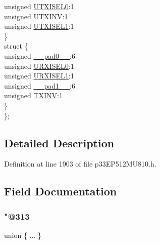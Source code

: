 \begin{DoxyCompactItemize}
\begin{tabbing}
\>\>unsigned \hyperlink{structtag_u3_s_t_a_b_i_t_s_aaff1f97a591df18ff20cf189a2944089}{UTXISEL0}:1\\
\>\>unsigned \hyperlink{structtag_u3_s_t_a_b_i_t_s_a08dde9c5ebe6558bfae4ea659190ddb6}{UTXINV}:1\\
\>\>unsigned \hyperlink{structtag_u3_s_t_a_b_i_t_s_af7ce0d24148cffc8fc3d8abccf37ea9f}{UTXISEL1}:1\\
\>\} \\
\>struct \{\\
\>\>unsigned \hyperlink{structtag_u3_s_t_a_b_i_t_s_adf71f3d8410c1f1dbbc96680a92c49af}{\_\_pad0\_\_}:6\\
\>\>unsigned \hyperlink{structtag_u3_s_t_a_b_i_t_s_af79a21216ad16ee2c61e03f238f42e6a}{URXISEL0}:1\\
\>\>unsigned \hyperlink{structtag_u3_s_t_a_b_i_t_s_a18f8693c16d1aaec33bf9058dc1ea2d2}{URXISEL1}:1\\
\>\>unsigned \hyperlink{structtag_u3_s_t_a_b_i_t_s_acaf2d0924a107ec6e8d2e31febaf66f9}{\_\_pad1\_\_}:6\\
\>\>unsigned \hyperlink{structtag_u3_s_t_a_b_i_t_s_a2baa3dcc3e10cb6a9f3fce197d05376b}{TXINV}:1\\
\>\} \\
\}; \\

\end{tabbing}\end{DoxyCompactItemize}


\subsection{Detailed Description}


Definition at line 1903 of file p33\+E\+P512\+M\+U810.\+h.



\subsection{Field Documentation}
\mbox{\label{structtag_u3_s_t_a_b_i_t_s_a9bba49bca10fe114e95e69a2e11405ce}} 
\subsubsection{\texorpdfstring{"@313}{@313}}
{\footnotesize\ttfamily union \{ ... \} }

\mbox{\label{structtag_u3_s_t_a_b_i_t_s_adf71f3d8410c1f1dbbc96680a92c49af}} 
